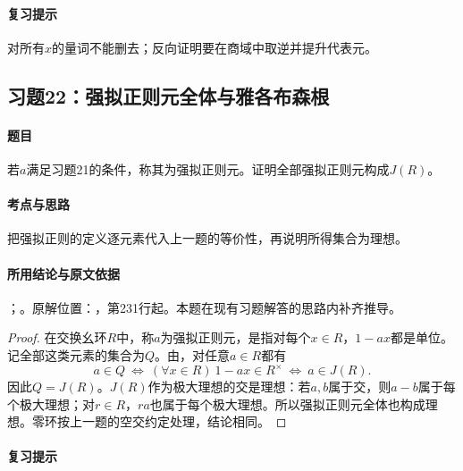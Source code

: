 \paragraph{复习提示}

对所有$x$的量词不能删去；反向证明要在商域中取逆并提升代表元。



\subsection{习题22：强拟正则元全体与雅各布森根}

\label{ex:3:22}

\paragraph{题目}

若$a$满足习题21的条件，称其为强拟正则元。证明全部强拟正则元构成$J(R)$。

\paragraph{考点与思路}

把强拟正则的定义逐元素代入上一题的等价性，再说明所得集合为理想。

\paragraph{所用结论与原文依据}

；。原解位置：，第231行起。本题在现有习题解答的思路内补齐推导。


\begin{proof}

在交换幺环$R$中，称$a$为强拟正则元，是指对每个$x\in R$，$1-ax$都是单位。记全部这类元素的集合为$Q$。由，对任意$a\in R$都有
\[
a\in Q\ \Longleftrightarrow\ (\forall x\in R)\ 1-ax\in R^\times
\ \Longleftrightarrow\ a\in J(R).
\]
因此$Q=J(R)$。$J(R)$作为极大理想的交是理想：若$a,b$属于交，则$a-b$属于每个极大理想；对$r\in R$，$ra$也属于每个极大理想。所以强拟正则元全体也构成理想。零环按上一题的空交约定处理，结论相同。

\end{proof}

\paragraph{复习提示}

